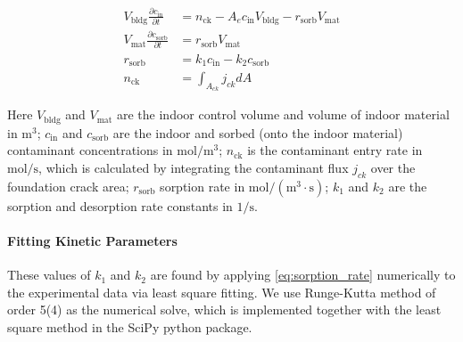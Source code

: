 \begin{align}
  V_\mathrm{bldg} \frac{\partial c_\mathrm{in}}{\partial t} &= n_\mathrm{ck} - A_e c_\mathrm{in} V_\mathrm{bldg} - r_\mathrm{sorb} V_\mathrm{mat}\label{eq:cstr} \\
  V_\mathrm{mat} \frac{\partial c_\mathrm{sorb}}{\partial t} &= r_\mathrm{sorb} V_\mathrm{mat}\label{eq:sorbed_concentration} \\
  r_\mathrm{sorb} &= k_1 c_\mathrm{in} - k_2 c_\mathrm{sorb}\label{eq:sorption_rate}\\
  n_\mathrm{ck} &= \int_{A_{ck}} j_{ck} dA
\end{align}

Here $V_\mathrm{bldg}$ and $V_\mathrm{mat}$ are the indoor control volume and volume of indoor material in $\mathrm{m^3}$;
$c_\mathrm{in}$ and $c_\mathrm{sorb}$ are the indoor and sorbed (onto the indoor material) contaminant concentrations in $\mathrm{mol/m^3}$;
$n_\mathrm{ck}$ is the contaminant entry rate in $\mathrm{mol/s}$, which is calculated by integrating the contaminant flux $j_{ck}$ over the foundation crack area;
$r_\mathrm{sorb}$ sorption rate in $\mathrm{mol/(m^3 \cdot s)}$;
$k_1$ and $k_2$ are the sorption and desorption rate constants in $\mathrm{1/s}$.\par

\paragraph{Fitting Kinetic Parameters}

These values of $k_1$ and $k_2$ are found by applying \eqref{eq:sorption_rate} numerically to the experimental data via least square fitting.
We use Runge-Kutta method of order 5(4) as the numerical solve, which is implemented together with the least square method in the SciPy python package\cite{jones_scipy_2011}.


